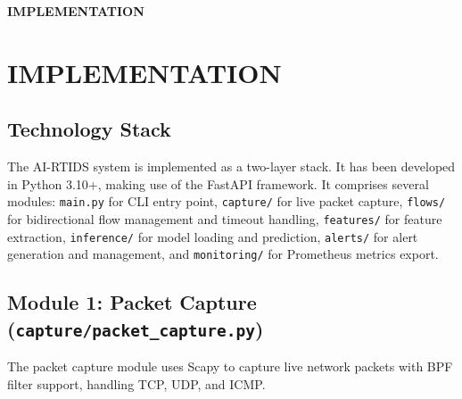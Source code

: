 \documentclass[12pt,a4paper]{report}
\newcommand{\chapterdivider}[1]{%
    \clearpage
    \thispagestyle{empty}
    \vspace*{\fill}
    \begin{center}
        \Huge\bfseries\color{mydarkblue} #1
    \end{center}
    \vspace*{\fill}
    \clearpage
}
\begin{document}
\chapterdivider{IMPLEMENTATION}

\chapter{IMPLEMENTATION}

\section{Technology Stack}

The AI-RTIDS system is implemented as a two-layer stack. It has been developed in Python 3.10+, making use of the FastAPI framework. It comprises several modules: \texttt{main.py} for CLI entry point, \texttt{capture/} for live packet capture, \texttt{flows/} for bidirectional flow management and timeout handling, \texttt{features/} for feature extraction, \texttt{inference/} for model loading and prediction, \texttt{alerts/} for alert generation and management, and \texttt{monitoring/} for Prometheus metrics export.

\section{Module 1: Packet Capture (\texttt{capture/packet\_capture.py})}

The packet capture module uses Scapy to capture live network packets with BPF filter support, handling TCP, UDP, and ICMP.
\end{document}
